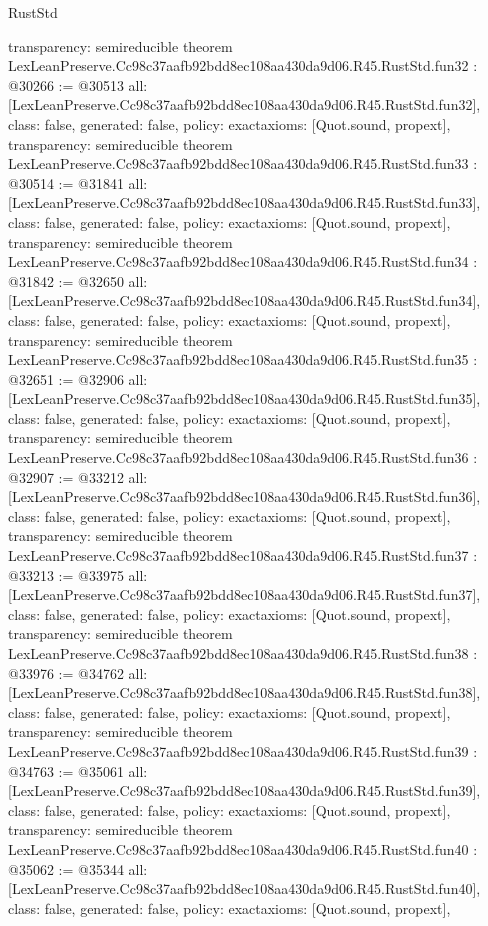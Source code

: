 \begin{lexlean}{RustStd}
\begin{coremodule}
{  transparency: semireducible
}
theorem LexLeanPreserve.Cc98c37aafb92bdd8ec108aa430da9d06.R45.RustStd.fun32 : @30266 := @30513 {
  all: [LexLeanPreserve.Cc98c37aafb92bdd8ec108aa430da9d06.R45.RustStd.fun32],
  class: false,
  generated: false,
  policy: exact{axioms: [Quot.sound, propext]},
  transparency: semireducible
}
theorem LexLeanPreserve.Cc98c37aafb92bdd8ec108aa430da9d06.R45.RustStd.fun33 : @30514 := @31841 {
  all: [LexLeanPreserve.Cc98c37aafb92bdd8ec108aa430da9d06.R45.RustStd.fun33],
  class: false,
  generated: false,
  policy: exact{axioms: [Quot.sound, propext]},
  transparency: semireducible
}
theorem LexLeanPreserve.Cc98c37aafb92bdd8ec108aa430da9d06.R45.RustStd.fun34 : @31842 := @32650 {
  all: [LexLeanPreserve.Cc98c37aafb92bdd8ec108aa430da9d06.R45.RustStd.fun34],
  class: false,
  generated: false,
  policy: exact{axioms: [Quot.sound, propext]},
  transparency: semireducible
}
theorem LexLeanPreserve.Cc98c37aafb92bdd8ec108aa430da9d06.R45.RustStd.fun35 : @32651 := @32906 {
  all: [LexLeanPreserve.Cc98c37aafb92bdd8ec108aa430da9d06.R45.RustStd.fun35],
  class: false,
  generated: false,
  policy: exact{axioms: [Quot.sound, propext]},
  transparency: semireducible
}
theorem LexLeanPreserve.Cc98c37aafb92bdd8ec108aa430da9d06.R45.RustStd.fun36 : @32907 := @33212 {
  all: [LexLeanPreserve.Cc98c37aafb92bdd8ec108aa430da9d06.R45.RustStd.fun36],
  class: false,
  generated: false,
  policy: exact{axioms: [Quot.sound, propext]},
  transparency: semireducible
}
theorem LexLeanPreserve.Cc98c37aafb92bdd8ec108aa430da9d06.R45.RustStd.fun37 : @33213 := @33975 {
  all: [LexLeanPreserve.Cc98c37aafb92bdd8ec108aa430da9d06.R45.RustStd.fun37],
  class: false,
  generated: false,
  policy: exact{axioms: [Quot.sound, propext]},
  transparency: semireducible
}
theorem LexLeanPreserve.Cc98c37aafb92bdd8ec108aa430da9d06.R45.RustStd.fun38 : @33976 := @34762 {
  all: [LexLeanPreserve.Cc98c37aafb92bdd8ec108aa430da9d06.R45.RustStd.fun38],
  class: false,
  generated: false,
  policy: exact{axioms: [Quot.sound, propext]},
  transparency: semireducible
}
theorem LexLeanPreserve.Cc98c37aafb92bdd8ec108aa430da9d06.R45.RustStd.fun39 : @34763 := @35061 {
  all: [LexLeanPreserve.Cc98c37aafb92bdd8ec108aa430da9d06.R45.RustStd.fun39],
  class: false,
  generated: false,
  policy: exact{axioms: [Quot.sound, propext]},
  transparency: semireducible
}
theorem LexLeanPreserve.Cc98c37aafb92bdd8ec108aa430da9d06.R45.RustStd.fun40 : @35062 := @35344 {
  all: [LexLeanPreserve.Cc98c37aafb92bdd8ec108aa430da9d06.R45.RustStd.fun40],
  class: false,
  generated: false,
  policy: exact{axioms: [Quot.sound, propext]},
}
\end{coremodule}
\end{lexlean}
